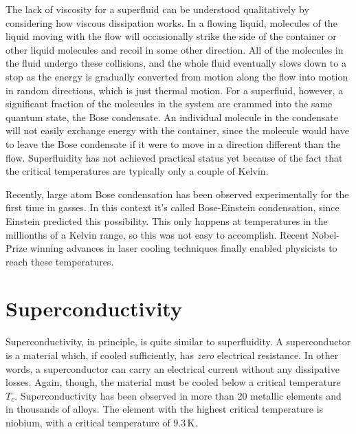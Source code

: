 The lack of viscosity for a superfluid can be understood qualitatively
by considering how viscous dissipation works.  In a flowing liquid,
molecules of the liquid moving with the flow will occasionally strike
the side of the container or other liquid molecules and recoil in some
other direction.  All of the molecules in the fluid undergo these
collisions, and the whole fluid eventually slows down to a stop as the
energy is gradually converted from motion along the flow into motion
in random directions, which is just thermal motion.  For a superfluid,
however, a significant fraction of the molecules in the system are
crammed into the same quantum state, the Bose condensate.  An
individual molecule in the condensate will not easily exchange energy
with the container, since the molecule would have to leave the Bose
condensate if it were to move in a direction different than the flow.
Superfluidity has not achieved practical status yet because of the
fact that the critical temperatures are typically only a couple of
Kelvin.

Recently, large atom Bose condensation has been observed
experimentally for the first time in gasses.  In this context it's
called Bose-Einstein condensation, since Einstein predicted this
possibility.  This only happens at temperatures in the millionths of a
Kelvin range, so this was not easy to accomplish.  Recent Nobel-Prize
winning advances in laser cooling techniques finally enabled
physicists to reach these temperatures.


\section{Superconductivity}

Superconductivity, in principle, is quite similar to superfluidity.
A superconductor is a material which, if cooled sufficiently, has {\em
zero} electrical resistance.  In other words, a superconductor can
carry an electrical current without any dissipative losses.  Again,
though, the material must be cooled below a critical temperature $T_c$.
Superconductivity has been observed in more than 20 metallic elements
and in thousands of alloys.  The element with the highest critical
temperature is niobium, with a critical temperature of $9.3\, \mbox{K}$.

